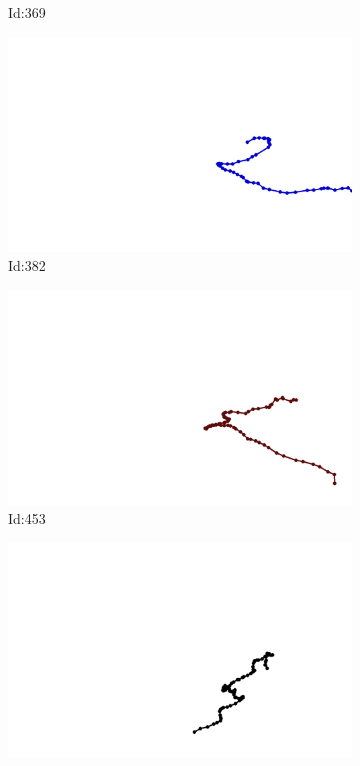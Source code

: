 \documentclass[12pt,twoside]{report}
\begin{document}
\begin{figure}
\begin{subfigure}[b]{0.20\textwidth}
\caption{Id:369}
\end{subfigure}
\begin{subfigure}[b]{0.20\textwidth}
\centering
\includegraphics[width=\textwidth]{../trajectories/382.png}
\caption{Id:382}
\end{subfigure}
\begin{subfigure}[b]{0.20\textwidth}
\centering
\includegraphics[width=\textwidth]{../trajectories/453.png}
\caption{Id:453}
\end{subfigure}
\begin{subfigure}[b]{0.20\textwidth}
\centering
\includegraphics[width=\textwidth]{../trajectories/535.png}

\end{subfigure}
\end{figure}
\end{document}
